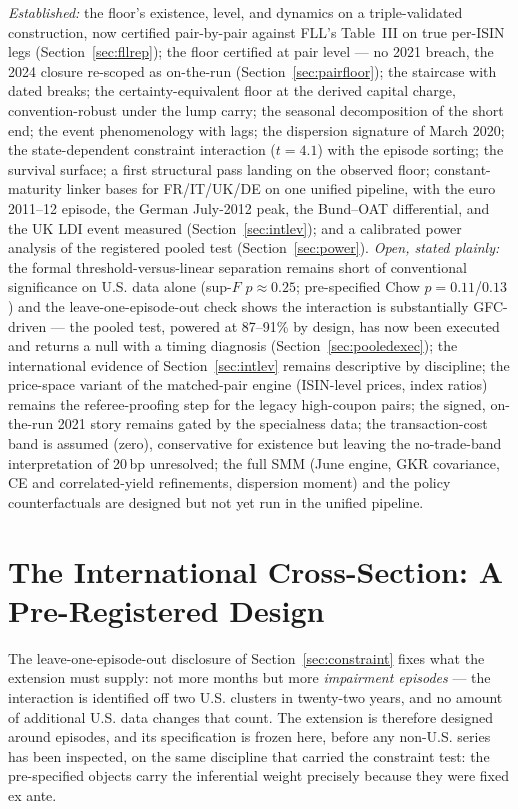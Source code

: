\documentclass[11pt]{article}
\begin{document}
\emph{Established:} the floor's existence, level, and dynamics on a triple-validated construction, now certified pair-by-pair against FLL's Table~III on true per-ISIN legs (Section~\ref{sec:fllrep}); the floor certified at pair level --- no 2021 breach, the 2024 closure re-scoped as on-the-run (Section~\ref{sec:pairfloor}); the staircase with dated breaks; the certainty-equivalent floor at the derived capital charge, convention-robust under the lump carry; the seasonal decomposition of the short end; the event phenomenology with lags; the dispersion signature of March 2020; the state-dependent constraint interaction ($t=4.1$) with the episode sorting; the survival surface; a first structural pass landing on the observed floor; constant-maturity linker bases for FR/IT/UK/DE on one unified pipeline, with the euro 2011--12 episode, the German July-2012 peak, the Bund--OAT differential, and the UK LDI event measured (Section~\ref{sec:intlev}); and a calibrated power analysis of the registered pooled test (Section~\ref{sec:power}). \emph{Open, stated plainly:} the formal threshold-versus-linear separation remains short of conventional significance on U.S. data alone (sup-$F$ $p\approx0.25$; pre-specified Chow $p=0.11$/$0.13$) and the leave-one-episode-out check shows the interaction is substantially GFC-driven --- the pooled test, powered at 87--91\% by design, has now been executed and returns a null with a timing diagnosis (Section~\ref{sec:pooledexec}); the international evidence of Section~\ref{sec:intlev} remains descriptive by discipline; the price-space variant of the matched-pair engine (ISIN-level prices, index ratios) remains the referee-proofing step for the legacy high-coupon pairs; the signed, on-the-run 2021 story remains gated by the specialness data; the transaction-cost band is assumed (zero), conservative for existence but leaving the no-trade-band interpretation of 20\,bp unresolved; the full SMM (June engine, GKR covariance, CE and correlated-yield refinements, dispersion moment) and the policy counterfactuals are designed but not yet run in the unified pipeline.

\section{The International Cross-Section: A Pre-Registered Design}\label{sec:intl}

The leave-one-episode-out disclosure of Section~\ref{sec:constraint} fixes what the extension must supply: not more months but more \emph{impairment episodes} --- the interaction is identified off two U.S. clusters in twenty-two years, and no amount of additional U.S. data changes that count. The extension is therefore designed around episodes, and its specification is frozen here, before any non-U.S. series has been inspected, on the same discipline that carried the constraint test: the pre-specified objects carry the inferential weight precisely because they were fixed ex ante.
\end{document}
